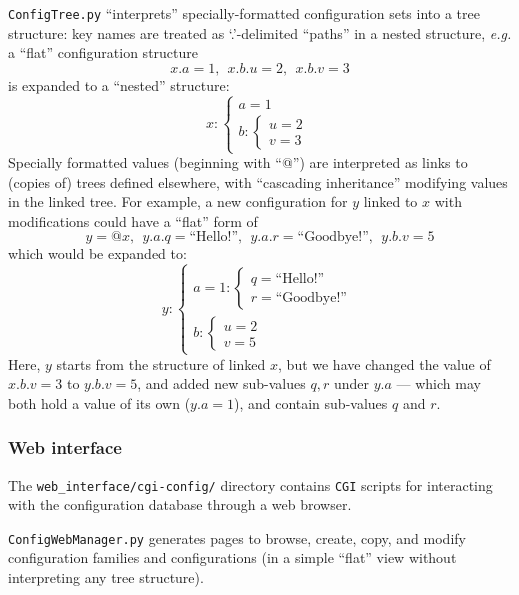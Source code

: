 \documentclass[12pt,english]{article}
\newcommand{\cd}[1]{\texttt{#1}}
\begin{document}
\cd{ConfigTree.py} ``interprets'' specially-formatted configuration sets into a tree structure:
	key names are treated as `.'-delimited ``paths'' in a nested structure,
	{\em e.g.} a ``flat'' configuration structure
\[ x.a = 1,\ \ x.b.u = 2,\ \ x.b.v = 3 \]
is expanded to a ``nested'' structure:
\newcommand{\brarray}[1]{\left\{ \begin{array}{l} #1  \end{array} \right.}
\[ x: \brarray{a = 1 \\ b: \brarray{u = 2 \\ v = 3}}\]
Specially formatted values (beginning with ``@'') are interpreted as links to (copies of) trees defined elsewhere,
	with ``cascading inheritance'' modifying values in the linked tree.
For example, a new configuration for $y$ linked to $x$ with modifications could have a ``flat'' form of
\[ y = @x,\ \ y.a.q = \textrm{``Hello!''},\ \ y.a.r = \textrm{``Goodbye!''},\ \ y.b.v = 5 \]
which would be expanded to:
\[ y: \brarray{a = 1: \brarray{q = \textrm{``Hello!''} \\ r = \textrm{``Goodbye!''}} \\ b: \brarray{u = 2 \\ v = 5}} \]
Here, $y$ starts from the structure of linked $x$, but we have changed the value of $x.b.v = 3$ to $y.b.v = 5$,
	and added new sub-values $q,r$ under $y.a$ --- which may both hold a value of its own ($y.a = 1$), and contain sub-values $q$ and $r$.

%
\subsubsection{Web interface}

The \cd{web\_interface/cgi-config/} directory contains \cd{CGI} scripts for interacting with the configuration database through a web browser.

\cd{ConfigWebManager.py} generates pages to browse, create, copy, and modify configuration families and configurations (in a simple ``flat'' view without interpreting any tree structure).
\end{document}
